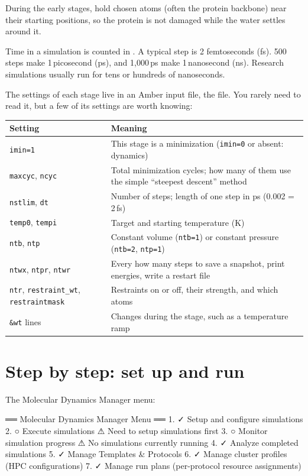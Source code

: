During the early stages,  hold chosen atoms (often the
protein backbone) near their starting positions, so the protein is not
damaged while the water settles around it.

Time in a simulation is counted in . A typical step is 2
femtoseconds (fs). 500 steps make 1\,picosecond (ps), and 1,000\,ps make
1\,nanosecond (ns). Research simulations usually run for tens or hundreds of
nanoseconds.

The settings of each stage live in an Amber input file, the  file.
You rarely need to read it, but a few of its settings are worth knowing:

\begin{tabularx}{\linewidth}{@{}lL@{}}
\toprule
\textbf{Setting} & \textbf{Meaning} \\
\midrule
\texttt{imin=1} & This stage is a minimization (\texttt{imin=0} or absent: dynamics) \\
\texttt{maxcyc}, \texttt{ncyc} & Total minimization cycles; how many of them use the simple ``steepest descent'' method \\
\texttt{nstlim}, \texttt{dt} & Number of steps; length of one step in ps (0.002 = 2\,fs) \\
\texttt{temp0}, \texttt{tempi} & Target and starting temperature (K) \\
\texttt{ntb}, \texttt{ntp} & Constant volume (\texttt{ntb=1}) or constant pressure (\texttt{ntb=2}, \texttt{ntp=1}) \\
\texttt{ntwx}, \texttt{ntpr}, \texttt{ntwr} & Every how many steps to save a snapshot, print energies, write a restart file \\
\texttt{ntr}, \texttt{restraint\_wt}, \texttt{restraintmask} & Restraints on or off, their strength, and which atoms \\
\texttt{\&wt} lines & Changes during the stage, such as a temperature ramp \\
\bottomrule
\end{tabularx}

\section{Step by step: set up and run}\label{sec:runningmd-steps}

The Molecular Dynamics Manager menu:

\begin{screen}
══ Molecular Dynamics Manager Menu ══
  1. ✓ Setup and configure simulations
  2. ○ Execute simulations
       ⚠ Need to setup simulations first
  3. ○ Monitor simulation progress
       ⚠ No simulations currently running
  4. ✓ Analyze completed simulations
  5. ✓ Manage Templates & Protocols
  6. ✓ Manage cluster profiles (HPC configurations)
  7. ✓ Manage run plans (per-protocol resource assignments)
\end{screen}

